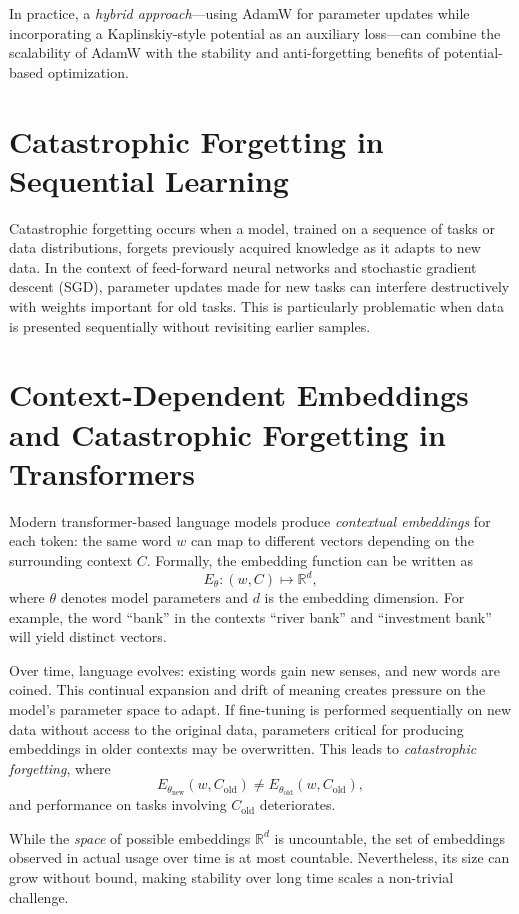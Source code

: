\documentclass[12pt]{article}
\begin{document}
In practice, a \emph{hybrid approach}---using AdamW for parameter updates while incorporating a Kaplinskiy-style potential as an auxiliary loss---can combine the scalability of AdamW with the stability and anti-forgetting benefits of potential-based optimization.
\section{Catastrophic Forgetting in Sequential Learning}

Catastrophic forgetting occurs when a model, trained on a sequence of tasks or data distributions, 
forgets previously acquired knowledge as it adapts to new data. In the context of feed-forward 
neural networks and stochastic gradient descent (SGD), parameter updates made for new tasks can 
interfere destructively with weights important for old tasks. This is particularly problematic 
when data is presented sequentially without revisiting earlier samples.

\section{Context-Dependent Embeddings and Catastrophic Forgetting in Transformers}

Modern transformer-based language models produce \emph{contextual embeddings} for each token: 
the same word $w$ can map to different vectors depending on the surrounding context $C$. 
Formally, the embedding function can be written as
\[
E_\theta: (w, C) \mapsto \mathbb{R}^d,
\]
where $\theta$ denotes model parameters and $d$ is the embedding dimension. 
For example, the word ``bank'' in the contexts ``river bank'' and ``investment bank'' 
will yield distinct vectors.

Over time, language evolves: existing words gain new senses, and new words are coined. 
This continual expansion and drift of meaning creates pressure on the model's parameter space 
to adapt. If fine-tuning is performed sequentially on new data without access to the original data, 
parameters critical for producing embeddings in older contexts may be overwritten. 
This leads to \emph{catastrophic forgetting}, where
\[
E_{\theta_{\mathrm{new}}}(w, C_{\mathrm{old}}) \neq 
E_{\theta_{\mathrm{old}}}(w, C_{\mathrm{old}}),
\]
and performance on tasks involving $C_{\mathrm{old}}$ deteriorates.

While the \emph{space} of possible embeddings $\mathbb{R}^d$ is uncountable, 
the set of embeddings observed in actual usage over time is at most countable. 
Nevertheless, its size can grow without bound, making stability over long time scales 
a non-trivial challenge.
\end{document}
